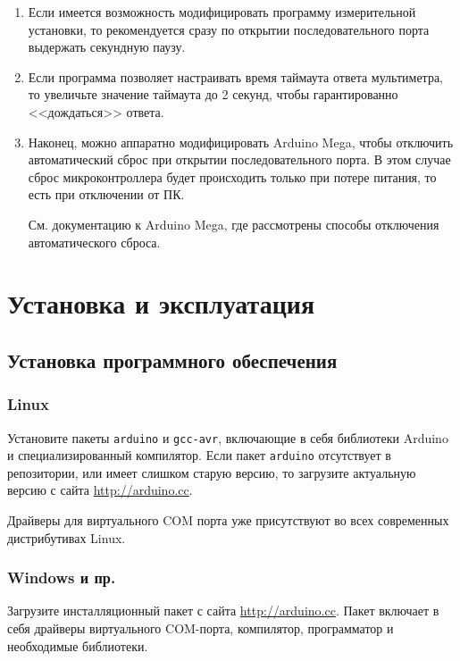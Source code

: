 \documentclass[12pt, a4paper]{article}
\newcommand{\Arduino}{Arduino Mega}
\begin{document}
\begin{enumerate}

\item Если имеется возможность модифицировать программу измерительной установки, то рекомендуется сразу по открытии последовательного порта выдержать секундную паузу.

\item Если программа позволяет настраивать время таймаута ответа мультиметра, то увеличьте значение таймаута до 2 секунд, чтобы гарантированно <<дождаться>> ответа.

\item Наконец, можно аппаратно модифицировать {\Arduino}, чтобы отключить автоматический сброс при открытии последовательного порта. В этом случае сброс микроконтроллера будет происходить только при потере питания, то есть при отключении от ПК.

См. документацию к {\Arduino}, где рассмотрены способы отключения автоматического сброса.

\end{enumerate}

\section{Установка и эксплуатация}

\subsection{Установка программного обеспечения}

\subsubsection{Linux}

Установите пакеты {\tt arduino} и {\tt gcc-avr}, включающие в себя библиотеки Arduino и специализированный компилятор. Если пакет {\tt arduino} отсутствует в репозитории, или имеет слишком старую версию, то загрузите актуальную версию с сайта \url{http://arduino.cc}.

Драйверы для виртуального COM порта уже присутствуют во всех современных дистрибутивах Linux.

\subsubsection{Windows и пр.}

Загрузите инсталляционный пакет с сайта \url{http://arduino.cc}. Пакет включает в себя драйверы виртуального COM-порта, компилятор, программатор и необходимые библиотеки.
\end{document}
